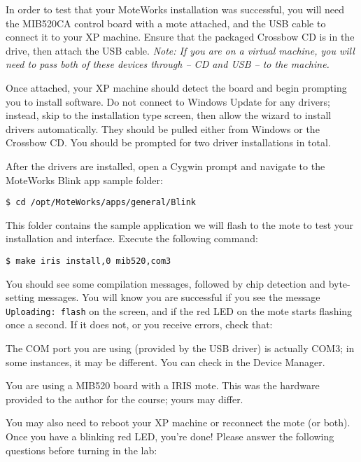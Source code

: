 \documentclass{article}
\begin{document}
In order to test that your MoteWorks installation was successful, you will need the MIB520CA control board with a mote attached, and the USB cable to connect it to your XP machine. Ensure that the packaged Crossbow CD is in the drive, then attach the USB cable. \textit{Note: If you are on a virtual machine, you will need to pass both of these devices through -- CD and USB -- to the machine.}

Once attached, your XP machine should detect the board and begin prompting you to install software. Do not connect to Windows Update for any drivers; instead, skip to the installation type screen, then allow the wizard to install drivers automatically. They should be pulled either from Windows or the Crossbow CD. You should be prompted for two driver installations in total.

After the drivers are installed, open a Cygwin prompt and navigate to the MoteWorks Blink app sample folder:

\begin{verbatim}
$ cd /opt/MoteWorks/apps/general/Blink
\end{verbatim}

This folder contains the sample application we will flash to the mote to test your installation and interface. Execute the following command:

\begin{verbatim}
$ make iris install,0 mib520,com3
\end{verbatim}

You should see some compilation messages, followed by chip detection and byte-setting messages. You will know you are successful if you see the message \verb!Uploading: flash! on the screen, and if the red LED on the mote starts flashing once a second. If it does not, or you receive errors, check that:

\begin{itemize*}
\item The COM port you are using (provided by the USB driver) is actually COM3; in some instances, it may be different. You can check in the Device Manager.
\item You are using a MIB520 board with a IRIS mote. This was the hardware provided to the author for the course; yours may differ.
\end{itemize*}

You may also need to reboot your XP machine or reconnect the mote (or both). Once you have a blinking red LED, you're done! Please answer the following questions before turning in the lab:
\end{document}

